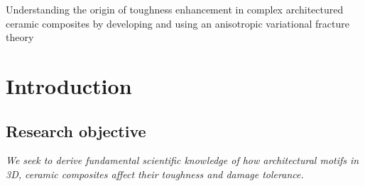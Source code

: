 \documentclass[10pt,letterpaper]{article}
\begin{document}
\setcounter{page}{1}

\begin{center}
  \fontsize{12}{2em}
  \selectfont
  Understanding the origin of toughness enhancement in complex architectured ceramic composites by developing and using an anisotropic variational fracture theory
\end{center}

\section{Introduction}
  \subsection{Research objective}
    \label{s:ro}
    \emph{We seek to derive fundamental scientific knowledge of how architectural motifs in 3D, ceramic composites affect their toughness and damage tolerance.}
\end{document}
